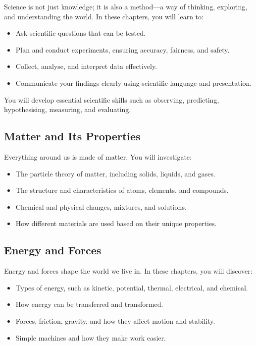 Science is not just knowledge; it is also a method—a way of thinking, exploring, and understanding the world. In these chapters, you will learn to:

\begin{itemize}
\item Ask scientific questions that can be tested.
\item Plan and conduct experiments, ensuring accuracy, fairness, and safety.
\item Collect, analyse, and interpret data effectively.
\item Communicate your findings clearly using scientific language and presentation.
\end{itemize}

You will develop essential scientific skills such as observing, predicting, hypothesising, measuring, and evaluating.

\subsection{Matter and Its Properties}

Everything around us is made of matter. You will investigate:

\begin{itemize}
\item The particle theory of matter, including solids, liquids, and gases.
\item The structure and characteristics of atoms, elements, and compounds.
\item Chemical and physical changes, mixtures, and solutions.
\item How different materials are used based on their unique properties.
\end{itemize}

\subsection{Energy and Forces}

Energy and forces shape the world we live in. In these chapters, you will discover:

\begin{itemize}
\item Types of energy, such as kinetic, potential, thermal, electrical, and chemical.
\item How energy can be transferred and transformed.
\item Forces, friction, gravity, and how they affect motion and stability.
\item Simple machines and how they make work easier.
\end{itemize}

